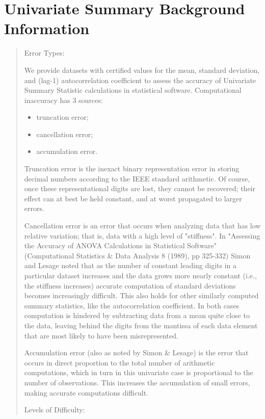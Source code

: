 \documentclass[10pt]{article}
\begin{document}
\section{Univariate Summary Background Information}
\begin{quote}


Error Types: 

We provide datasets with certified values for the mean, standard deviation, and (lag-1) autocorrelation coefficient to assess the accuracy of Univariate Summary Statistic calculations in statistical software. Computational inaccuracy has 3 sources:
\begin{itemize}
   \item truncation error;
   \item cancellation error;
   \item accumulation error.
\end{itemize}


Truncation error is the inexact binary representation error in storing decimal numbers according to the IEEE standard arithmetic. Of course, once these representational digits are lost, they cannot be recovered; their effect can at best be held constant, and at worst propagated to larger errors. 

Cancellation error is an error that occurs when analyzing data that has low relative variation; that is, data with a high level of "stiffness". In "Assessing the Accuracy of ANOVA Calculations in Statistical Software" (Computational Statistics \& Data Analysis 8 (1989), pp 325-332) Simon and Lesage noted that as the number of constant leading digits in a particular dataset increases and the data grows more nearly constant (i.e., the stiffness increases) accurate computation of standard deviations becomes increasingly difficult. This also holds for other similarly computed summary statistics, like the autocorrelation coefficient. In both cases computation is hindered by subtracting data from a mean quite close to the data, leaving behind the digits from the mantissa of each data element that are most likely to have been misrepresented. 

Accumulation error (also as noted by Simon \& Lesage) is the error that occurs in direct proportion to the total number of arithmetic computations, which in turn in this univariate case is proportional to the number of observations. This increases the accumulation of small errors, making accurate computations difficult. 

Levels of Difficulty: 


\end{quote}
\end{document}
